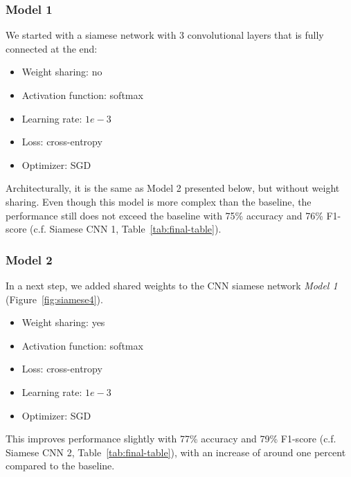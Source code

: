 \documentclass[10pt,conference,compsocconf]{IEEEtran}
\begin{document}
\subsubsection*{Model 1}
We started with a siamese network with 3 convolutional layers that is fully connected at the end:
\begin{itemize}
    \item Weight sharing: no 
    \item Activation function: softmax \item Learning rate: $1e-3$
    \item Loss: cross-entropy
    \item Optimizer: SGD
\end{itemize}

Architecturally, it is the same as Model 2 presented below, but without weight sharing. Even though this model is more complex than the baseline, the performance still does not exceed the baseline with 75\% accuracy and 76\% F1-score (c.f. Siamese CNN 1, Table~\ref{tab:final-table}). \newline

\subsubsection*{Model 2}
In a next step, we added shared weights to the CNN siamese network \textit{Model 1} (Figure~\ref{fig:siamese4}).
\begin{itemize}
    \item Weight sharing: yes 
    \item Activation function: softmax
    \item Loss: cross-entropy
    \item Learning rate: $1e-3$
    \item Optimizer: SGD
\end{itemize}
This improves performance slightly with 77\% accuracy and 79\% F1-score (c.f. Siamese CNN 2, Table~\ref{tab:final-table}), with an increase of around one percent compared to the baseline. \newline
\end{document}
